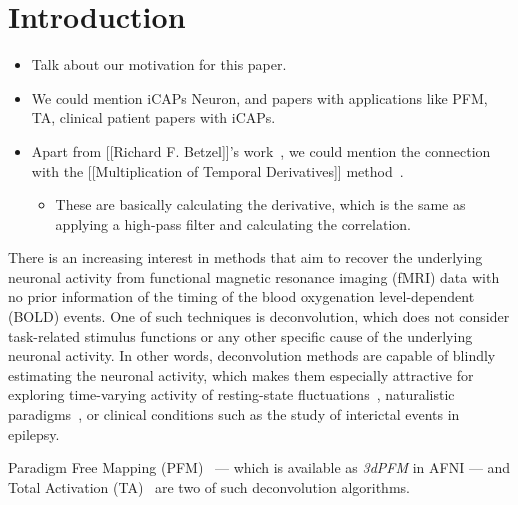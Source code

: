\section{Introduction}

\begin{itemize}

    \item Talk about our motivation for this paper.

    \item We could mention iCAPs Neuron, and papers with applications like PFM, TA, clinical patient papers with iCAPs.

    \item Apart from [[Richard F. Betzel]]'s work~\cite{betzel2020temporal,esfahlani2020high,faskowitz2020edge}, we could mention the connection with the
    [[Multiplication of Temporal Derivatives]] method~\cite{shine2015estimation,shine2016dynamics}.

    \begin{itemize}
        \item These are basically calculating the derivative, which is the same as applying a high-pass filter and calculating the correlation.
    \end{itemize}

\end{itemize}


There is an increasing interest in methods that aim to recover the underlying neuronal activity from functional magnetic resonance imaging (fMRI) data with no prior information of the timing of the blood oxygenation level-dependent (BOLD) events. One of such techniques is deconvolution, which does not consider task-related stimulus functions or any other specific cause of the underlying neuronal activity. In other words, deconvolution methods are capable of blindly estimating the neuronal activity, which makes them especially attractive for exploring time-varying activity of resting-state fluctuations~\cite{petridou2013periods,karahanouglu2015transient,karahanouglu2017dynamics,kinany2020dynamic,gonzalez2019imaging}, naturalistic paradigms~\cite{betzel2020temporal}, or clinical conditions such as the study of interictal events in epilepsy.

Paradigm Free Mapping (PFM)~\cite{gaudes2013paradigm} --- which is available as \textit{3dPFM} in AFNI --- and Total Activation (TA)~\cite{karahanouglu2013total} are two of such deconvolution algorithms.

